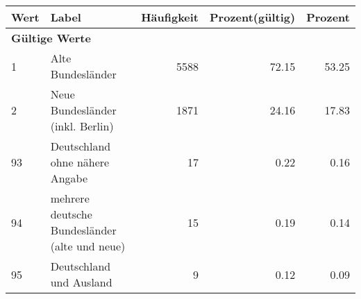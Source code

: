      \begin{longtable}{lXrrr}
     \toprule
     \textbf{Wert} & \textbf{Label} & \textbf{Häufigkeit} & \textbf{Prozent(gültig)} & \textbf{Prozent} \\
     \endhead
     \midrule
     \multicolumn{5}{l}{\textbf{Gültige Werte}}\\

     1 &
     \multicolumn{1}{X}{ Alte Bundesländer   } &


       \num{5588} &
       \num[round-mode=places,round-precision=2]{72,15} &
         \num[round-mode=places,round-precision=2]{53,25} \\

     2 &
     \multicolumn{1}{X}{ Neue Bundesländer (inkl. Berlin)   } &


       \num{1871} &
       \num[round-mode=places,round-precision=2]{24,16} &
         \num[round-mode=places,round-precision=2]{17,83} \\

     93 &
     \multicolumn{1}{X}{ Deutschland ohne nähere Angabe   } &


       \num{17} &
       \num[round-mode=places,round-precision=2]{0,22} &
         \num[round-mode=places,round-precision=2]{0,16} \\

     94 &
     \multicolumn{1}{X}{ mehrere deutsche Bundesländer (alte und neue)   } &


       \num{15} &
       \num[round-mode=places,round-precision=2]{0,19} &
         \num[round-mode=places,round-precision=2]{0,14} \\

     95 &
     \multicolumn{1}{X}{ Deutschland und Ausland   } &


       \num{9} &
       \num[round-mode=places,round-precision=2]{0,12} &
         \num[round-mode=places,round-precision=2]{0,09} \\


\end{longtable}
